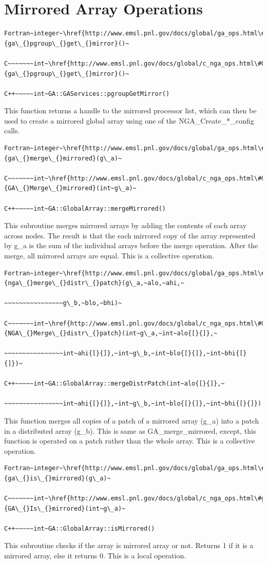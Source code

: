 \section{Mirrored Array Operations}
\begin{verbatim}
Fortran~integer~\href{http://www.emsl.pnl.gov/docs/global/ga_ops.html\#GA_PGROUP_GET_MIRROR}{ga\_{}pgroup\_{}get\_{}mirror}()~

C~~~~~~~int~\href{http://www.emsl.pnl.gov/docs/global/c_nga_ops.html\#GA_PGROUP_GET_MIRROR}{ga\_{}pgroup\_{}get\_{}mirror}()~

C++~~~~~int~GA::GAServices::pgroupGetMirror()
\end{verbatim}
This function returns a handle to the mirrored processor list, which
can then be used to create a mirrored global array using one of the
NGA\_Create\_{*}\_config calls.
\begin{verbatim}
Fortran~integer~\href{http://www.emsl.pnl.gov/docs/global/ga_ops.html\#GA_MERGE_MIRRORED}{ga\_{}merge\_{}mirrored}(g\_a)~

C~~~~~~~int~\href{http://www.emsl.pnl.gov/docs/global/c_nga_ops.html\#GA_MERGE_MIRRORED}{GA\_{}Merge\_{}mirrored}(int~g\_a)~

C++~~~~~int~GA::GlobalArray::mergeMirrored()
\end{verbatim}
This subroutine merges mirrored arrays by adding the contents of each
array across nodes. The result is that the each mirrored copy of the
array represented by g\_a is the sum of the individual arrays before
the merge operation. After the merge, all mirrored arrays are equal.
This is a collective operation.
\begin{verbatim}
Fortran~integer~\href{http://www.emsl.pnl.gov/docs/global/ga_ops.html\#GA_MERGE_DISTR_PATCH}{nga\_{}merge\_{}distr\_{}patch}(g\_a,~alo,~ahi,~

~~~~~~~~~~~~~~~~g\_b,~blo,~bhi)~

C~~~~~~~int~\href{http://www.emsl.pnl.gov/docs/global/c_nga_ops.html\#GA_MERGE_DISTR_PATCH}{NGA\_{}Merge\_{}distr\_{}patch}(int~g\_a,~int~alo{[}{]},~

~~~~~~~~~~~~~~~~int~ahi{[}{]},~int~g\_b,~int~blo{[}{]},~int~bhi{[}{]})~

C++~~~~~int~GA::GlobalArray::mergeDistrPatch(int~alo{[}{]},~

~~~~~~~~~~~~~~~~int~ahi{[}{]},~int~g\_b,~int~blo{[}{]},~int~bhi{[}{]})
\end{verbatim}
This function merges all copies of a patch of a mirrored array (g\_a)
into a patch in a distributed array (g\_b). This is same as GA\_merge\_mirrored,
except, this function is operated on a patch rather than the whole
array. This is a collective operation.
\begin{verbatim}
Fortran~integer~\href{http://www.emsl.pnl.gov/docs/global/ga_ops.html\#ga_is_mirrored}{ga\_{}is\_{}mirrored}(g\_a)~

C~~~~~~~int~\href{http://www.emsl.pnl.gov/docs/global/c_nga_ops.html\#ga_is_mirrored}{GA\_{}Is\_{}mirrored}(int~g\_a)~

C++~~~~~int~GA::GlobalArray::isMirrored()
\end{verbatim}
This subroutine checks if the array is mirrored array or not. Returns
1 if it is a mirrored array, else it returns 0. This is a local operation. 
